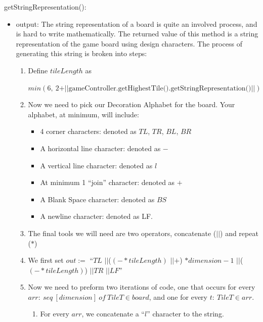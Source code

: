 \documentclass[12pt]{article}
\newcommand{\concat}{$\vert\vert$}
\begin{document}
\noindent getStringRepresentation():
\begin{itemize}
  \item output:
        \noindent The string representation of a board is quite an involved process, and is hard to write mathematically. The returned value of this method is a string representation of the game board using design characters. The process of generating this string is broken into steps:

        \begin{enumerate}
          \item Define $tileLength$ as

                $min(6,\ 2 + \vert\vert\text{gameController.getHighestTile().getStringRepresentation()}\vert\vert)$

          \item Now we need to pick our Decoration Alphabet for the board. Your alphabet, at minimum, will include:

                \begin{itemize}
                  \item 4 corner characters: denoted as $TL$, $TR$, $BL$, $BR$
                  \item A horizontal line character: denoted as $-$
                  \item A vertical line character: denoted as $l$
                  \item At minimum 1 ``join'' character: denoted as $+$
                  \item A Blank Space character: denoted as $BS$
                  \item A newline character: denoted as LF.
                \end{itemize}

          \item The final tools we will need are two operators, concatenate (\concat) and repeat ($*$)

          \item We first set
                $out := $ ``$TL$ \concat ($(- * tileLength)$ \concat $+$) $* dimension - 1$ \concat ($(- * tileLength)$) \concat $TR$ \concat $LF$''

          \item Now we need to preform two iterations of code, one that occurs for every $arr:\ seq\ [dimension]\ of\ TileT \in board$, and one for every $t:\ TileT \in arr$.

                \begin{enumerate}
                  \item For every $arr$, we concatenate a ``$l$'' character to the string.


\end{enumerate}
\end{enumerate}
\end{itemize}
\end{document}

